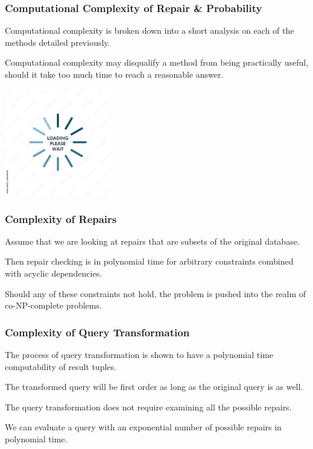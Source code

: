 \begin{frame}
\frametitle{Computational Complexity of Repair \& Probability}

Computational complexity is broken down into a short analysis on each of the methods detailed previously.

Computational complexity may disqualify a method from being practically useful, should it take too much time to reach a reasonable answer.

\begin{center}
	\includegraphics[width=0.35\textwidth]{images/pleasewait.jpg}
\end{center}


\end{frame}


\begin{frame}
\frametitle{Complexity of Repairs}

Assume that we are looking at repairs that are subsets of the original database.

Then repair checking is in polynomial time for arbitrary constraints combined with acyclic dependencies. 

Should any of these constraints not hold, the problem is pushed into the realm of co-NP-complete problems.


\end{frame}

\begin{frame}
\frametitle{Complexity of Query Transformation}

The process of query transformation is shown to have a polynomial time computability of result tuples. 

The transformed query will be first order as long as the original query is as well. 

The query transformation does not require examining all the possible repairs.

We can evaluate a query with an exponential number of possible repairs in polynomial time.

\end{frame}


